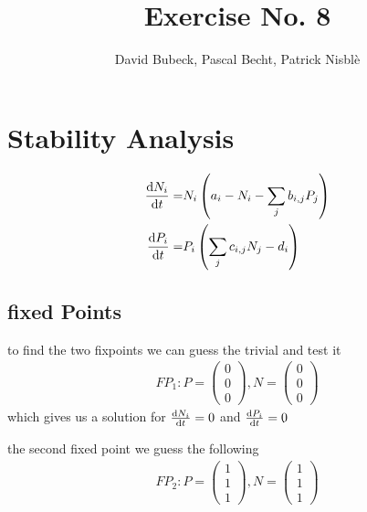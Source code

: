 \documentclass[11pt, a4paper, reqno]{scrartcl}
\begin{document}
    \title{Exercise No. 8}
    \author{David Bubeck, Pascal Becht, Patrick Nisbl\`e}
    \maketitle
    

    \section{Stability Analysis}
    
    \begin{align}
        \frac{\text d N_i}{\text d t} =& N_i\left( a_i-N_i-\sum_j b_{i,j}P_j \right) \\
        \frac{\text d P_i}{\text d t} =& P_i\left( \sum_j c_{i,j}N_j -d_i \right)
    \end{align}
    \subsection{fixed Points}
    to find the two fixpoints we can guess the trivial and test it
    \begin{align}
        FP_1:P=\begin{pmatrix}
            0\\0\\0
        \end{pmatrix}, N=\begin{pmatrix}
            0\\0\\0
        \end{pmatrix}
    \end{align}
    which gives us a solution for $\frac{\text d N_i}{\text d t} = 0$ and $\frac{\text d P_i}{\text d t} = 0$
    
    the second fixed point we guess the following
    \begin{align}
        FP_2:P=\begin{pmatrix}
        1\\1\\1
        \end{pmatrix}, N=\begin{pmatrix}
        1\\1\\1
        \end{pmatrix}
    \end{align}
    
\end{document}
